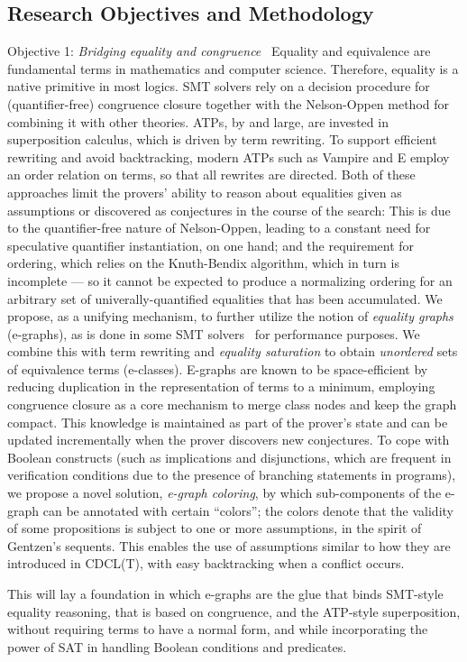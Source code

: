 \subsection{Research Objectives and Methodology}


\begin{paragraph}{Objective 1: {\it Bridging equality and congruence}}~
Equality and equivalence are fundamental terms in mathematics and computer science.
Therefore, equality is a native primitive in most logics.
SMT solvers rely on a decision procedure for (quantifier-free) congruence closure together with the Nelson-Oppen method for combining it with other theories.
ATPs, by and large, are invested in superposition calculus, which is driven by term rewriting.
To support efficient rewriting and avoid backtracking, modern ATPs such as Vampire and E employ an order relation on terms, so that all rewrites are directed.
Both of these approaches limit the provers' ability to reason about equalities given as assumptions or discovered as conjectures in the course of the search:
This is due to the quantifier-free nature of Nelson-Oppen, leading to a constant need for speculative quantifier instantiation, on one hand;
and the requirement for ordering, which relies on the Knuth-Bendix algorithm, which in turn is incomplete --- so it cannot be expected to produce a normalizing ordering for an arbitrary set of univerally-quantified equalities that has been accumulated.
We propose, as a unifying mechanism, to further utilize the notion of \emph{equality graphs} (e-graphs), as is done in some SMT solvers~\cite{CADE2007:deMoura} for performance purposes.
We combine this with term rewriting and \emph{equality saturation} to obtain \emph{unordered} sets of equivalence terms (e-classes).
E-graphs are known to be space-efficient by reducing duplication in the representation of terms to a minimum, employing congruence closure as a core mechanism to merge class nodes and keep the graph compact.
This knowledge is maintained as part of the prover's state and can be updated incrementally when the prover discovers new conjectures.
To cope with Boolean constructs (such as implications and disjunctions, which are frequent in verification conditions due to the presence of branching statements in programs), we propose a novel solution, \emph{e-graph coloring}, by which sub-components of the e-graph can be annotated with certain ``colors''; the colors denote that the validity of some propositions is subject to one or more assumptions, in the spirit of Gentzen's sequents.
This enables the use of assumptions similar to how they are introduced in CDCL(T), with easy backtracking when a conflict occurs.

This will lay a foundation in which e-graphs are the glue that binds SMT-style equality reasoning, that is based on congruence, and the ATP-style superposition, without requiring terms to have a normal form, and while incorporating the power of SAT in handling Boolean conditions and predicates.
\end{paragraph}

